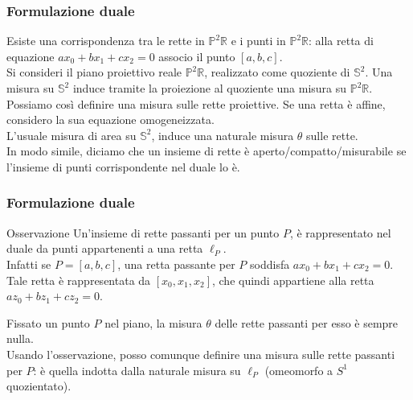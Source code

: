 \documentclass[11pt]{beamer} %
\newcommand{\R}{\mathbb{R}}
\renewcommand{\S}{\mathbb{S}}
\renewcommand{\P}{\mathbb{P}}
\newcommand{\<}{\langle}
\renewcommand{\>}{\rangle}
\theoremstyle{theorem}
\theoremstyle{theorem}
\theoremstyle{theorem}
\theoremstyle{theorem}
\theoremstyle{theorem}
\begin{document}


\begin{frame}
	\frametitle{Formulazione duale}
	Esiste una corrispondenza tra le rette in $\P^2 \R$ e i punti in $\P^2\R$: alla retta di equazione $ax_0+bx_1+cx_2=0$ associo il punto $[a,b,c]$.\\
	\pause
	Si consideri il piano proiettivo reale $\P^2 \R$, realizzato come quoziente di $\S^2$. Una misura su $\S^2$ induce tramite la proiezione al quoziente una misura su $\P^2\R$.\\
	\pause
	Possiamo così definire una misura sulle rette proiettive. Se una retta è affine, considero la sua equazione omogeneizzata.\\
	L'usuale misura di area su $\S^2$, induce una naturale misura $\theta$ sulle rette.\\
	\pause
	In modo simile, diciamo che un insieme di rette è aperto/compatto/misurabile se l'insieme di punti corrispondente nel duale lo è.

	
\end{frame}

\begin{frame}
	\frametitle{Formulazione duale}
	
	\begin{block}{Osservazione}
		Un'insieme di rette passanti per un punto $P$, è rappresentato nel duale da punti appartenenti a una retta $\ell_P$.\\
		\pause
		Infatti se $P=[a,b,c]$, una retta passante per $P$ soddisfa $ax_0+bx_1+cx_2=0$. Tale retta è rappresentata da $[x_0,x_1,x_2]$, che quindi appartiene alla retta $az_0+bz_1+cz_2=0$.\\
	\end{block}
	
	Fissato un punto $P$ nel piano, la misura $\theta$ delle rette passanti per esso è sempre nulla.\\
	\pause
	Usando l'osservazione, posso comunque definire una misura sulle rette passanti per $P$: è quella indotta dalla naturale misura su $\ell_P$ (omeomorfo a $S^1$ quozientato).\\
\end{frame}	

	
\end{document}
